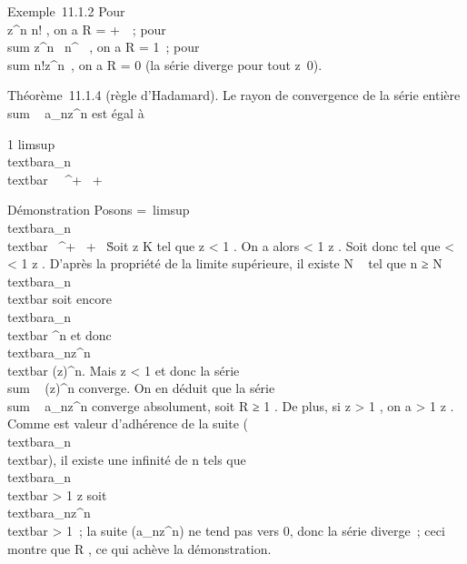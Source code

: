 \documentclass[]{article}
\begin{document}
Exemple~11.1.2 Pour \\\sum
  z^n \over n! , on a R = +\infty~~; pour
\\sum   z^n~
\over n^\alpha~ , on a R = 1~; pour
\\sum  n!z^n~,
on a R = 0 (la série diverge pour tout z\neq~0).

Théorème~11.1.4 (règle d'Hadamard). Le rayon de convergence de la série
entière \\sum ~
a\_nz^n est égal à

 1 \over
limsup\rootn\of\\textbar{}a\_n\\textbar{}~
\in {}~^+ \cup\ + \infty~\

Démonstration Posons \ell =\
limsup\rootn\of\\textbar{}a\_n\\textbar{}
\in {}~^+ \cup\ + \infty~\. Soit z \in K
tel que \textbar{}z\textbar{} \textless{} 1 \over \ell .
On a alors \ell \textless{} 1 \over
\textbar{}z\textbar{} . Soit donc \rho tel que \ell \textless{} \rho
\textless{} 1 \over \textbar{}z\textbar{} . D'après
la propriété de la limite supérieure, il existe N \in {}~ tel que n ≥ N
\rigtharrow~\rootn\of\\textbar{}a\_n\\textbar{}
\leq \rho soit encore
\\textbar{}a\_n\\textbar{} \leq
\rho^n et donc
\\textbar{}a\_nz^n\\textbar{}
\leq (\rho\textbar{}z\textbar{})^n. Mais \rho\textbar{}z\textbar{}
\textless{} 1 et donc la série
\\sum ~
(\rho\textbar{}z\textbar{})^n converge. On en déduit que la
série \\sum ~
a\_nz^n converge absolument, soit R ≥ 1
\over \ell . De plus, si \textbar{}z\textbar{}
\textgreater{} 1 \over \ell , on a \ell \textgreater{} 1
\over \textbar{}z\textbar{} . Comme \ell est valeur
d'adhérence de la suite
(\rootn\of\\textbar{}a\_n\\textbar{}),
il existe une infinité de n tels que
\rootn\of\\textbar{}a\_n\\textbar{}
\textgreater{} 1 \over \textbar{}z\textbar{} soit
\\textbar{}a\_nz^n\\textbar{}
\textgreater{} 1~; la suite (a\_nz^n) ne tend pas
vers 0, donc la série diverge~; ceci montre que R 
\over \ell , ce qui achève la démonstration.
\end{document}
